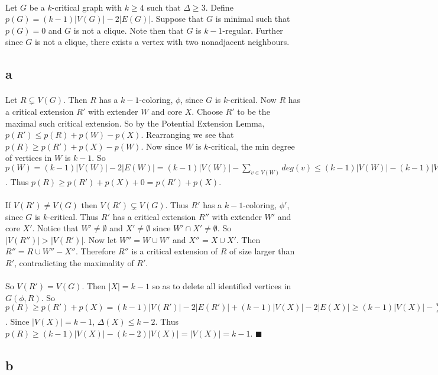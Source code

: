 \documentclass[letterpaper,12pt,oneside,onecolumn]{report}
\begin{document}
\paragraph{}
Let $G$ be a $k$-critical graph with $k\geq 4$ such that $\Delta \geq 3$. Define $p(G) = (k-1)|V(G)| - 2|E(G)|$. Suppose that $G$ is minimal such that $p(G) = 0$ and $G$ is not a clique. Note then that $G$ is $k-1$-regular. Further since $G$ is not a clique, there exists a vertex with two nonadjacent neighbours.
\subsection*{a}
\paragraph{}
Let $R \subsetneq V(G)$. Then $R$ has a $k-1$-coloring, $\phi$, since $G$ is $k$-critical. Now $R$ has a critical extension $R'$ with extender $W$ and core $X$. Choose $R'$ to be the maximal such critical extension. So by the Potential Extension Lemma, $p(R') \leq p(R) + p(W) - p(X)$. Rearranging we see that $p(R) \geq p(R') + p(X) - p(W)$. Now since $W$ is $k$-critical, the min degree of vertices in $W$ is $k-1$. So $p(W) = (k-1)|V(W)| - 2|E(W)| = (k-1)|V(W)| - \sum_{v \in V(W)} deg(v) \leq (k-1)|V(W)| -(k-1)|V(W)| = 0$. Thus $p(R) \geq p(R') + p(X) + 0 = p(R') + p(X)$.
\paragraph{}
If $V(R') \neq V(G)$ then $V(R') \subsetneq V(G)$. Thus $R'$ has a $k-1$-coloring, $\phi'$, since $G$ is $k$-critical. Thus $R'$ has a critical extension $R''$ with extender $W'$ and core $X'$. Notice that $W' \neq \emptyset$ and $X' \neq \emptyset$ since $W' \cap X' \neq \emptyset$. So $|V(R'')| > |V(R')|$. Now let $W'' = W \cup W'$ and $X'' = X \cup X'$. Then $R'' = R \cup W'' - X''$. Therefore $R''$ is a critical extension of $R$ of size larger than $R'$, contradicting the maximality of $R'$.
\paragraph{}
So $V(R') = V(G)$. Then $|X| = k-1$ so as to delete all identified vertices in $G(\phi,R)$. So $p(R) \geq p(R') + p(X) = (k-1)|V(R')| - 2|E(R')| + (k-1)|V(X)| - 2|E(X)| \geq (k-1)|V(X)| - \sum_{v \in V(X)} deg(v)$. Since $|V(X)| = k-1$, $\Delta(X) \leq k-2$. Thus $p(R) \geq (k-1)|V(X)| - (k-2)|V(X)| = |V(X)| = k-1$. $\blacksquare$
\subsection*{b}
\end{document}
